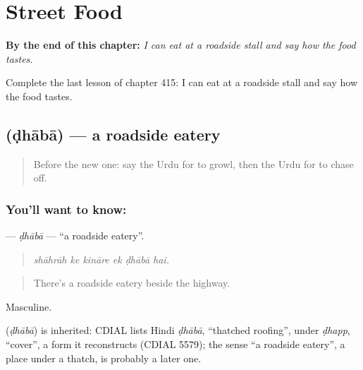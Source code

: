 
\chapter{Street Food}
\label{ch:ur-street-food}

\begin{chapteropening}
\textbf{By the end of this chapter:} \emph{I can eat at a roadside stall and say how the food tastes.}

Complete the last lesson of chapter 415: I can eat at a roadside stall and say how the food tastes.
\end{chapteropening}

\section[\texorpdfstring{\ur{ڈھابا} (ḍhābā)}{ڈھابا (ḍhābā)}]{ (ḍhābā) — a roadside eatery}

\label{lesson:UR-C415-dhaba}



\begin{quote}
Before the new one: say the Urdu for to growl, then the Urdu for to chase off.
\end{quote}

\subsection*{You'll want to know: }
\textbf{} — \emph{ḍhābā} — \textquotedblleft{}a roadside eatery\textquotedblright{}.

\begin{quote}
     
\end{quote}

\begin{quote}
\emph{shāhrāh ke kināre ek ḍhābā hai.}
\end{quote}

\begin{quote}
There's a roadside eatery beside the highway.
\end{quote}

Masculine.

\begin{cousinweb}
\textbf{} (\emph{ḍhābā}) is inherited: CDIAL lists Hindi \emph{ḍhābā}, \textquotedblleft{}thatched roofing\textquotedblright{}, under \emph{ḍhapp}, \textquotedblleft{}cover\textquotedblright{}, a form it reconstructs (CDIAL 5579); the sense \textquotedblleft{}a roadside eatery\textquotedblright{}, a place under a thatch, is probably a later one.
\end{cousinweb}

